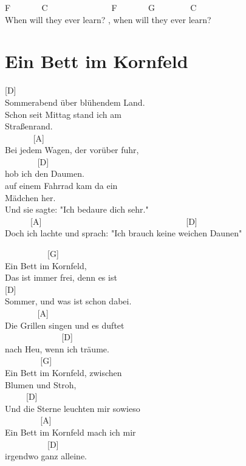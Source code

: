 \documentclass[
  letterpaper,
  twoside=false]{scrbook}
\begin{document}
F ~ ~ ~ ~ C ~ ~ ~ ~ ~ ~ ~ ~ ~F ~ ~ ~ ~ G ~ ~ ~ ~ ~C\\
When will they ever learn? , when will they ever learn?

\hypertarget{ein-bett-im-kornfeld}{%
\chapter{Ein Bett im Kornfeld}\label{ein-bett-im-kornfeld}}

{[}D{]}\\
Sommerabend über blühendem Land.\\
Schon seit Mittag stand ich am\\
Straßenrand.\\
\hspace*{0.333em} ~ ~ ~ ~ {[}A{]}\\
Bei jedem Wagen, der vorüber fuhr,\\
\hspace*{0.333em} ~ ~ ~ ~ ~{[}D{]}\\
hob ich den Daumen.\\
auf einem Fahrrad kam da ein\\
Mädchen her.\\
Und sie sagte: "Ich bedaure dich sehr."\\
\hspace*{0.333em} ~ ~ ~ ~{[}A{]} ~ ~ ~ ~ ~ ~ ~ ~ ~ ~ ~ ~ ~ ~ ~ ~ ~ ~ ~ ~
{[}D{]}\\
Doch ich lachte und sprach: "Ich brauch keine weichen Daunen"

~ ~ ~ ~ ~ ~ {[}G{]}\\
Ein Bett im Kornfeld,\\
Das ist immer frei, denn es ist\\
{[}D{]}\\
Sommer, und was ist schon dabei.\\
\hspace*{0.333em} ~ ~ ~ ~ ~{[}A{]}\\
Die Grillen singen und es duftet\\
\hspace*{0.333em} ~ ~ ~ ~ ~ ~ ~ ~ {[}D{]}\\
nach Heu, wenn ich träume.\\
\hspace*{0.333em} ~ ~ ~ ~ ~ {[}G{]}\\
Ein Bett im Kornfeld, zwischen\\
Blumen und Stroh,\\
\hspace*{0.333em} ~ ~ ~ {[}D{]}\\
Und die Sterne leuchten mir sowieso\\
\hspace*{0.333em} ~ ~ ~ ~ ~ {[}A{]}\\
Ein Bett im Kornfeld mach ich mir\\
\hspace*{0.333em} ~ ~ ~ ~ ~ ~ {[}D{]}\\
irgendwo ganz alleine.
\end{document}
